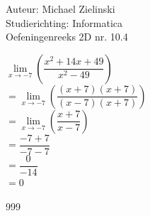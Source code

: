 \documentclass[a4paper]{article}
\begin{document}
  
\noindent \large Auteur: Michael Zielinski \\
\noindent \large Studierichting: Informatica\\
\noindent \large Oefeningenreeks 2D nr. 10.4\\
\medskip
\normalsize

$\lim\limits_{x\rightarrow -7} \left(\dfrac{x^2+14x+49}{x^2-49}\right)$ \\

$= \lim\limits_{x\rightarrow -7} \left(\dfrac{\left(x+7\right)\left(x+7\right)}{\left(x-7\right)\left(x+7\right)}\right)$ \\

$= \lim\limits_{x\rightarrow -7} \left(\dfrac{x+7}{x-7}\right)$ \\

$= \dfrac{-7+7}{-7-7}$ \\

$= \dfrac{0}{-14}$ \\

$= 0$ \\

\begin{thebibliography}{999}
\end{thebibliography}
\end{document}
